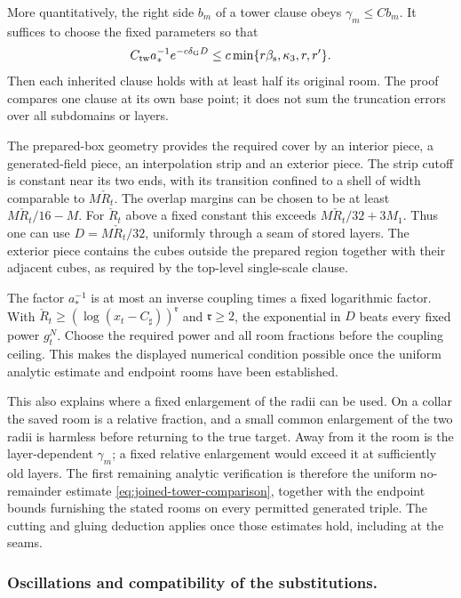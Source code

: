 \documentclass[11pt,letterpaper,reqno]{amsart}
\theoremstyle{definition}
\theoremstyle{remark}
\begin{document}
More quantitatively, the right side $b_m$ of a tower clause obeys
$\gamma_m\le Cb_m$. It suffices to choose the fixed parameters so
that
\[
 C_{\rm tw}a_*^{-1}e^{-c\delta_{\mathrm G}D}
             \le c\min\{r\beta_{\mathrm s},\kappa_3,r,r'\}.
\]
Then each inherited clause holds with at least half its original
room. The proof compares one clause at its own base point; it
does not sum the truncation errors over all subdomains or layers.

The prepared-box geometry provides the required cover by an
interior piece, a generated-field piece, an interpolation strip
and an exterior piece. The strip cutoff is constant near its two
ends, with its transition confined to a shell of width comparable
to $M\check R_t$. The overlap margins can be chosen to be at
least $M\check R_t/16-M$. For $\check R_t$ above a fixed
constant this exceeds $M\check R_t/32+3M_1$. Thus one can use
$D=M\check R_t/32$, uniformly through a seam of stored layers.
The exterior piece contains the cubes outside the prepared region
together with their adjacent cubes, as required by the top-level
single-scale clause.

The factor $a_*^{-1}$ is at most an inverse coupling times a fixed
logarithmic factor. With
$\check R_t\ge(\log(x_t-C_\sharp))^{\mathfrak r}$ and
$\mathfrak r\ge2$, the exponential in $D$ beats every fixed
power $g_t^N$. Choose the required power and all room fractions
before the coupling ceiling. This makes the displayed numerical
condition possible once the uniform analytic estimate and
endpoint rooms have been established.

This also explains where a fixed enlargement of the radii can be
used. On a collar the saved room is a relative fraction, and a
small common enlargement of the two radii is harmless before
returning to the true target. Away from it the room is the
layer-dependent $\gamma_m$; a fixed relative enlargement would
exceed it at sufficiently old layers. The first remaining analytic
verification is therefore the uniform no-remainder estimate
\eqref{eq:joined-tower-comparison}, together with the endpoint
bounds furnishing the stated rooms on every permitted generated
triple. The cutting and gluing deduction applies once those
estimates hold, including at the seams.

\subsubsection*{Oscillations and compatibility of the substitutions.}
\end{document}

